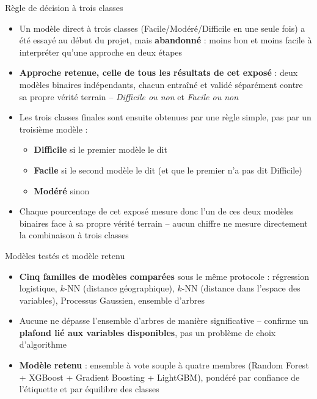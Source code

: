 \documentclass[11pt,aspectratio=169]{beamer}
\begin{document}
\begin{frame}{R\`egle de d\'ecision \`a trois classes}
  \footnotesize
  \begin{itemize}
    \setlength\itemsep{0.6em}
    \item Un mod\`ele direct \`a trois classes (Facile/Mod\'er\'e/Difficile en une
      seule fois) a \'et\'e essay\'e au d\'ebut du projet, mais \textbf{abandonn\'e} :
      moins bon et moins facile \`a interpr\'eter qu'une approche en deux \'etapes
    \item \textbf{Approche retenue, celle de tous les r\'esultats de cet expos\'e} :
      deux mod\`eles binaires ind\'ependants, chacun entra\^in\'e et valid\'e s\'epar\'ement
      contre sa propre v\'erit\'e terrain -- \emph{Difficile ou non} et \emph{Facile
      ou non}
    \item Les trois classes finales sont ensuite obtenues par une r\`egle simple, pas
      par un troisi\`eme mod\`ele :
      \begin{itemize}
        \item \textbf{Difficile} si le premier mod\`ele le dit
        \item \textbf{Facile} si le second mod\`ele le dit (et que le premier n'a pas
          dit Difficile)
        \item \textbf{Mod\'er\'e} sinon
      \end{itemize}
    \item Chaque pourcentage de cet expos\'e mesure donc l'un de ces deux mod\`eles
      binaires face \`a sa propre v\'erit\'e terrain -- aucun chiffre ne mesure
      directement la combinaison \`a trois classes
  \end{itemize}
\end{frame}

\begin{frame}{Mod\`eles test\'es et mod\`ele retenu}
  \begin{itemize}
    \setlength\itemsep{0.8em}
    \item \textbf{Cinq familles de mod\`eles compar\'ees} sous le m\^eme protocole :
      r\'egression logistique, $k$-NN (distance g\'eographique), $k$-NN (distance dans
      l'espace des variables), Processus Gaussien, ensemble d'arbres
    \item Aucune ne d\'epasse l'ensemble d'arbres de mani\`ere significative --
      confirme un \textbf{plafond li\'e aux variables disponibles}, pas un probl\`eme de
      choix d'algorithme
    \item \textbf{Mod\`ele retenu} : ensemble \`a vote souple \`a quatre membres
      (Random Forest + XGBoost + Gradient Boosting + LightGBM), pond\'er\'e par
      confiance de l'\'etiquette et par \'equilibre des classes
  \end{itemize}
\end{frame}
\end{document}
